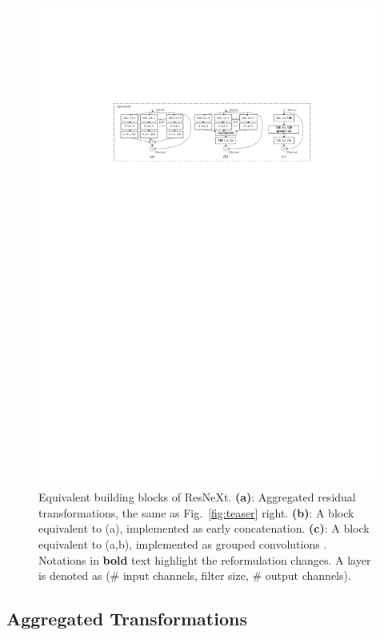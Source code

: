 \documentclass[10pt,twocolumn,letterpaper]{article}
\begin{document}
\begin{figure}[t]
\centering
\vspace{-1em}
\includegraphics[width=0.95\linewidth]{figures/blocks/blocks}
\caption{Equivalent building blocks of ResNeXt.
\textbf{(a)}: Aggregated residual transformations, the same as Fig.~\ref{fig:teaser} right.
\textbf{(b)}: A block equivalent to (a), implemented as early concatenation.
\textbf{(c)}: A block equivalent to (a,b), implemented as grouped convolutions \cite{Krizhevsky2012}. Notations in \textbf{bold} text highlight the reformulation changes. A layer is denoted as (\# input channels, filter size, \# output channels).
}
\label{fig:blocks}
\end{figure}


\subsection{Aggregated Transformations}
\end{document}
